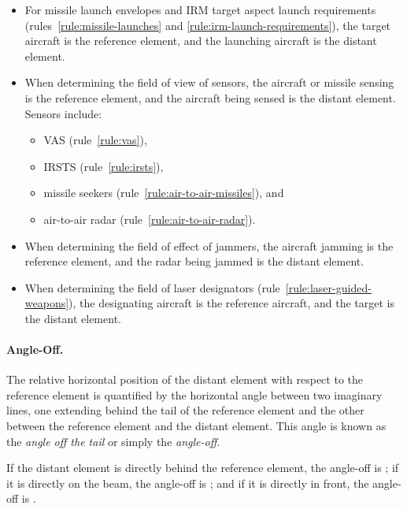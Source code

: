 {\begin{itemize}
\item For missile launch envelopes and IRM target aspect launch requirements (rules~\ref{rule:missile-launches} and \ref{rule:irm-launch-requirements}), the target aircraft is the reference element, and the launching aircraft is the distant element.

\item When determining the field of view of sensors, the aircraft or missile sensing is the reference element, and the aircraft being sensed is the distant element. Sensors include:
\begin{itemize} 
\item VAS (rule~\ref{rule:vas}),
\item IRSTS (rule~\ref{rule:irsts}),
\item missile seekers (rule~\ref{rule:air-to-air-missiles}), and
\item air-to-air radar (rule~\ref{rule:air-to-air-radar}).
\end{itemize}


\item When determining the field of effect of jammers, the aircraft jamming is the reference element, and the radar being jammed is the distant element.

\item When determining the field of laser designators (rule~\ref{rule:laser-guided-weapons}), the designating aircraft is the reference aircraft, and the target is the distant element.

\end{itemize}





\paragraph{Angle-Off.} 

The relative horizontal position of the distant element with respect to the reference element is quantified by the horizontal angle between two imaginary lines, one extending behind the tail of the reference element and the other between the reference element and the distant element. This angle is known as the \emph{angle off the tail} or simply the \emph{angle-off}. 

If the distant element is directly behind the reference element, the angle-off is ; if it is directly on the beam, the angle-off is ; and if it is directly in front, the angle-off is .

}
